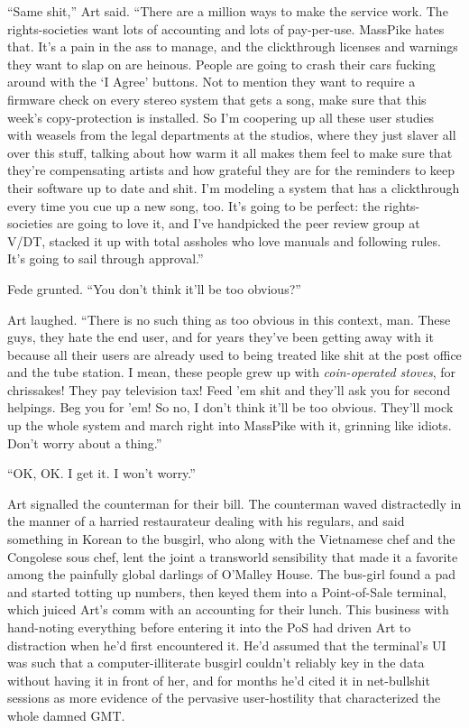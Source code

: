 “Same shit,” Art said. “There are a million ways to make the
service work. The rights-societies want lots of accounting and lots
of pay-per-use. MassPike hates that. It’s a pain in the ass to
manage, and the clickthrough licenses and warnings they want to
slap on are heinous. People are going to crash their cars fucking
around with the ‘I Agree’ buttons. Not to mention they want to
require a firmware check on every stereo system that gets a song,
make sure that this week’s copy-protection is installed. So I’m
coopering up all these user studies with weasels from the legal
departments at the studios, where they just slaver all over this
stuff, talking about how warm it all makes them feel to make sure
that they’re compensating artists and how grateful they are for the
reminders to keep their software up to date and shit. I’m modeling
a system that has a clickthrough every time you cue up a new song,
too. It’s going to be perfect: the rights-societies are going to
love it, and I’ve handpicked the peer review group at V/DT, stacked
it up with total assholes who love manuals and following rules.
It’s going to sail through approval.”

Fede grunted. “You don’t think it’ll be too obvious?”

Art laughed. “There is no such thing as too obvious in this
context, man. These guys, they hate the end user, and for years
they’ve been getting away with it because all their users are
already used to being treated like shit at the post office and the
tube station. I mean, these people grew up with
\emph{coin-operated stoves}, for chrissakes! They pay television
tax! Feed ’em shit and they’ll ask you for second helpings. Beg you
for ’em! So no, I don’t think it’ll be too obvious. They’ll mock up
the whole system and march right into MassPike with it, grinning
like idiots. Don’t worry about a thing.”

“OK, OK. I get it. I won’t worry.”

Art signalled the counterman for their bill. The counterman waved
distractedly in the manner of a harried restaurateur dealing with
his regulars, and said something in Korean to the busgirl, who
along with the Vietnamese chef and the Congolese sous chef, lent
the joint a transworld sensibility that made it a favorite among
the painfully global darlings of O’Malley House. The bus-girl found
a pad and started totting up numbers, then keyed them into a
Point-of-Sale terminal, which juiced Art’s comm with an accounting
for their lunch. This business with hand-noting everything before
entering it into the PoS had driven Art to distraction when he’d
first encountered it. He’d assumed that the terminal’s UI was such
that a computer-illiterate busgirl couldn’t reliably key in the
data without having it in front of her, and for months he’d cited
it in net-bullshit sessions as more evidence of the pervasive
user-hostility that characterized the whole damned GMT.

